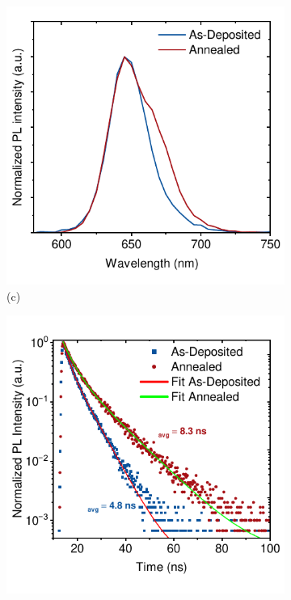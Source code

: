 \begin{figure}[htbp]
    \vspace{1em} %

    \begin{subfigure}[t]{0.45\textwidth}
        \centering
        \includegraphics[width=\textwidth]{chapters/material_properties/images/SSPL_norm.pdf} %
        \caption*{(c)}
    \end{subfigure}
    \hfill
    \begin{subfigure}[t]{0.45\textwidth}
        \centering
        \includegraphics[width=\textwidth]{chapters/material_properties/images/TRPL_norm_double - Copy.pdf} %

\end{subfigure}
\end{figure}
